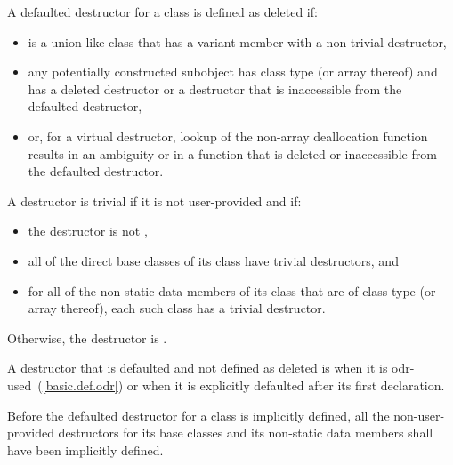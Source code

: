 \pnum
A defaulted destructor for a class
   is defined as deleted if:
\begin{itemize}
\item {} is a union-like class that has a variant
  member with a non-trivial destructor,

\item any potentially constructed subobject has class type
   (or array thereof) and
   has a deleted destructor or a destructor
  that is inaccessible from the defaulted destructor,

\item or, for a virtual destructor, lookup of the non-array deallocation
  function results in an ambiguity or in a function that is deleted or
  inaccessible from the defaulted destructor.
\end{itemize}

A destructor is trivial if it is not user-provided and if:

\begin{itemize}
\item the destructor is not ,

\item all of the direct base classes of its class have trivial destructors, and

\item for all of the non-static data members of its class that are of class
type (or array thereof), each such class has a trivial destructor.
\end{itemize}

Otherwise, the destructor is
.

\pnum
{}%
A destructor
that is defaulted and not defined as deleted
is
when it is odr-used~(\ref{basic.def.odr})
or when it is explicitly defaulted after its first declaration.

\pnum
Before the
defaulted destructor for a class is implicitly defined, all the non-user-provided
destructors for its base classes and its non-static data members shall have been
implicitly defined.

